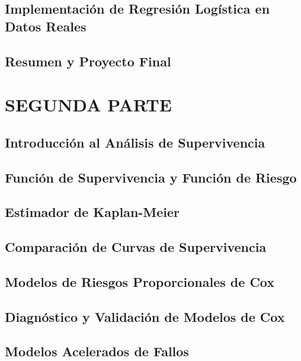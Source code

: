 \documentclass{report}
\begin{document}
\chapter{Implementaci\'on de Regresi\'on Logística en Datos Reales}


\chapter{Resumen y Proyecto Final}



\part{SEGUNDA PARTE}
\chapter{Introducci\'on al An\'alisis de Supervivencia}


\chapter{Funci\'on de Supervivencia y Funci\'on de Riesgo}


\chapter{Estimador de Kaplan-Meier}


\chapter{Comparaci\'on de Curvas de Supervivencia}


\chapter{Modelos de Riesgos Proporcionales de Cox}


\chapter{Diagn\'ostico y Validaci\'on de Modelos de Cox}


\chapter{Modelos Acelerados de Fallos}

\end{document}
